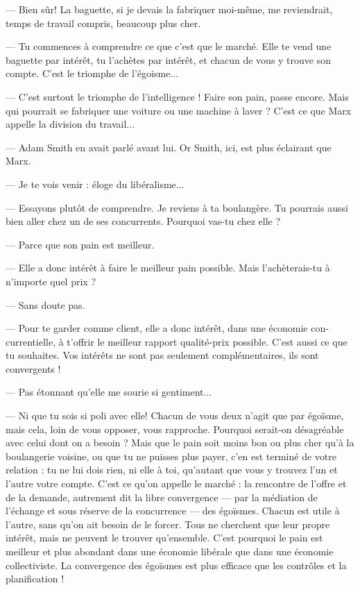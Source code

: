 — Bien sûr! La baguette, si je devais la fabriquer moi-même, me reviendrait,
temps de travail compris, beaucoup plus cher.

— Tu commences à comprendre ce que c’est que le marché. Elle te vend
une baguette par intérêt, tu l’achètes par intérêt, et chacun de vous y trouve son
compte. C’est le triomphe de l’égoisme...

— C’est surtout le triomphe de l'intelligence ! Faire son pain, passe encore.
Mais qui pourrait se fabriquer une voiture ou une machine à laver ? C’est ce
que Marx appelle la division du travail...

— Adam Smith en avait parlé avant lui. Or Smith, ici, est plus éclairant que
Marx.

— Je te vois venir : éloge du libéralisme...

— Essayons plutôt de comprendre. Je reviens à ta boulangère. Tu pourrais
aussi bien aller chez un de ses concurrents. Pourquoi vas-tu chez elle ?

— Parce que son pain est meilleur.

— Elle a donc intérêt à faire le meilleur pain possible. Mais l’achèterais-tu à
n'importe quel prix ?

— Sans doute pas.

— Pour te garder comme client, elle a donc intérêt, dans une économie con-
currentielle, à t'offrir le meilleur rapport qualité-prix possible. C’est aussi ce
que tu souhaites. Vos intérêts ne sont pas seulement complémentaires, ils sont
convergents !

— Pas étonnant qu’elle me sourie si gentiment...

— Ni que tu sois si poli avec elle! Chacun de vous deux n’agit que par
égoïsme, mais cela, loin de vous opposer, vous rapproche. Pourquoi serait-on
désagréable avec celui dont on a besoin ? Mais que le pain soit moins bon ou
plus cher qu’à la boulangerie voisine, ou que tu ne puisses plus payer, c'en est
terminé de votre relation : tu ne lui dois rien, ni elle à toi, qu’autant que vous
y trouvez l’un et l’autre votre compte. C’est ce qu’on appelle le marché : la rencontre
de l’offre et de la demande, autrement dit la libre convergence — par la
médiation de l'échange et sous réserve de la concurrence — des égoïsmes.
Chacun est utile à l’autre, sans qu’on ait besoin de le forcer. Tous ne cherchent
que leur propre intérêt, mais ne peuvent le trouver qu’ensemble. C’est pourquoi
le pain est meilleur et plus abondant dans une économie libérale que dans
une économie collectiviste. La convergence des égoïsmes est plus efficace que
les contrôles et la planification !

